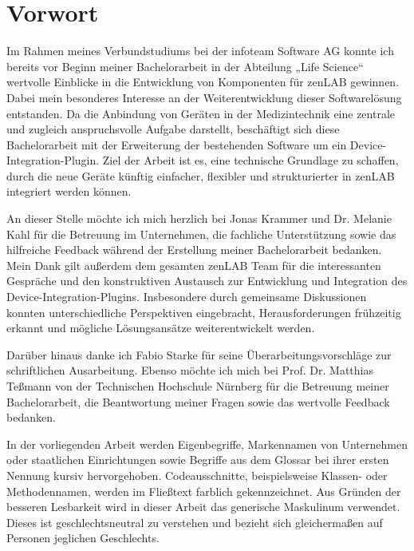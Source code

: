 \chapter*{Vorwort}

Im Rahmen meines Verbundstudiums bei der infoteam Software AG konnte ich bereits vor Beginn meiner Bachelorarbeit in der Abteilung „Life Science“ wertvolle Einblicke in die Entwicklung von Komponenten für zenLAB gewinnen.
Dabei mein besonderes Interesse an der Weiterentwicklung dieser Softwarelösung entstanden. 
Da die Anbindung von Geräten in der Medizintechnik eine zentrale und zugleich anspruchsvolle Aufgabe darstellt, beschäftigt sich diese Bachelorarbeit mit der Erweiterung der bestehenden Software 
um ein Device-Integration-Plugin. 
Ziel der Arbeit ist es, eine technische Grundlage zu schaffen, durch die neue Geräte künftig einfacher, flexibler und strukturierter in zenLAB integriert werden können.

An dieser Stelle möchte ich mich herzlich bei Jonas Krammer und Dr. Melanie Kahl für die Betreuung im Unternehmen, 
die fachliche Unterstützung sowie das hilfreiche Feedback während der Erstellung meiner Bachelorarbeit bedanken. 
Mein Dank gilt außerdem dem gesamten zenLAB Team für die interessanten Gespräche und den konstruktiven Austausch zur Entwicklung und Integration des Device-Integration-Plugins. 
Insbesondere durch gemeinsame Diskussionen konnten unterschiedliche Perspektiven eingebracht, Herausforderungen frühzeitig erkannt und mögliche Lösungsansätze weiterentwickelt werden.

Darüber hinaus danke ich Fabio Starke für seine Überarbeitungsvorschläge zur schriftlichen Ausarbeitung. 
Ebenso möchte ich mich bei Prof. Dr. Matthias Teßmann von der Technischen Hochschule Nürnberg für die Betreuung meiner Bachelorarbeit, 
die Beantwortung meiner Fragen sowie das wertvolle Feedback bedanken.

In der vorliegenden Arbeit werden Eigenbegriffe, 
Markennamen von Unternehmen oder staatlichen Einrichtungen sowie Begriffe aus dem Glossar bei ihrer ersten Nennung kursiv hervorgehoben. 
Codeausschnitte, beispielsweise Klassen- oder Methodennamen, werden im Fließtext farblich gekennzeichnet. 
Aus Gründen der besseren Lesbarkeit wird in dieser Arbeit das generische Maskulinum verwendet. 
Dieses ist geschlechtsneutral zu verstehen und bezieht sich gleichermaßen auf Personen jeglichen Geschlechts.
